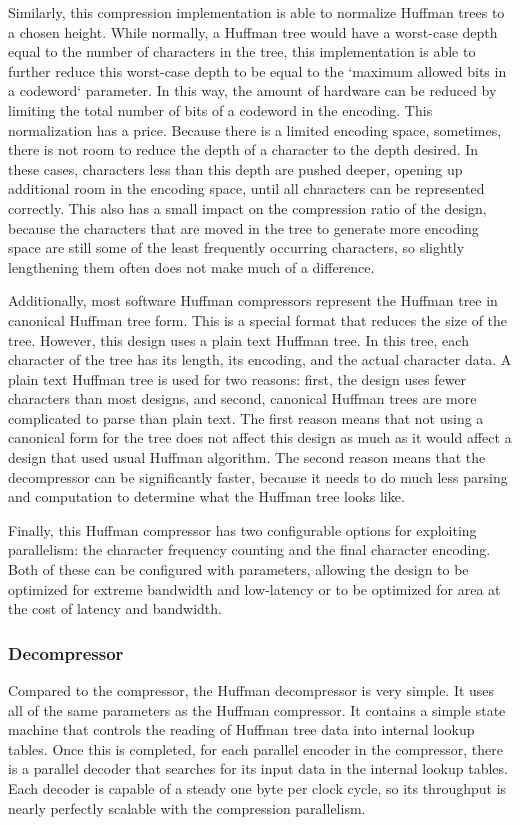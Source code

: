 \documentclass[doublespace,nopageskip]{VTthesis}
\begin{document}
Similarly, this compression implementation is able to normalize Huffman trees to a chosen height. While normally, a Huffman tree would have a worst-case depth equal to the number of characters in the tree, this implementation is able to further reduce this worst-case depth to be equal to the `maximum allowed bits in a codeword` parameter. In this way, the amount of hardware can be reduced by limiting the total number of bits of a codeword in the encoding. This normalization has a price. Because there is a limited encoding space, sometimes, there is not room to reduce the depth of a character to the depth desired. In these cases, characters less than this depth are pushed deeper, opening up additional room in the encoding space, until all characters can be represented correctly. This also has a small impact on the compression ratio of the design, because the characters that are moved in the tree to generate more encoding space are still some of the least frequently occurring characters, so slightly lengthening them often does not make much of a difference.

Additionally, most software Huffman compressors represent the Huffman tree in canonical Huffman tree form. This is a special format that reduces the size of the tree. However, this design uses a plain text Huffman tree. In this tree, each character of the tree has its length, its encoding, and the actual character data. A plain text Huffman tree is used for two reasons: first, the design uses fewer characters than most designs, and second, canonical Huffman trees are more complicated to parse than plain text. The first reason means that not using a canonical form for the tree does not affect this design as much as it would affect a design that used usual Huffman algorithm. The second reason means that the decompressor can be significantly faster, because it needs to do much less parsing and computation to determine what the Huffman tree looks like. 

Finally, this Huffman compressor has two configurable options for exploiting parallelism: the character frequency counting and the final character encoding. Both of these can be configured with parameters, allowing the design to be optimized for extreme bandwidth and low-latency or to be optimized for area at the cost of latency and bandwidth.

\subsubsection{Decompressor}\label{sss:huffman_decompressor_design}
Compared to the compressor, the Huffman decompressor is very simple. It uses all of the same parameters as the Huffman compressor. It contains a simple state machine that controls the reading of Huffman tree data into internal lookup tables. Once this is completed, for each parallel encoder in the compressor, there is a parallel decoder that searches for its input data in the internal lookup tables. Each decoder is capable of a steady one byte per clock cycle, so its throughput is nearly perfectly scalable with the compression parallelism.
\end{document}
